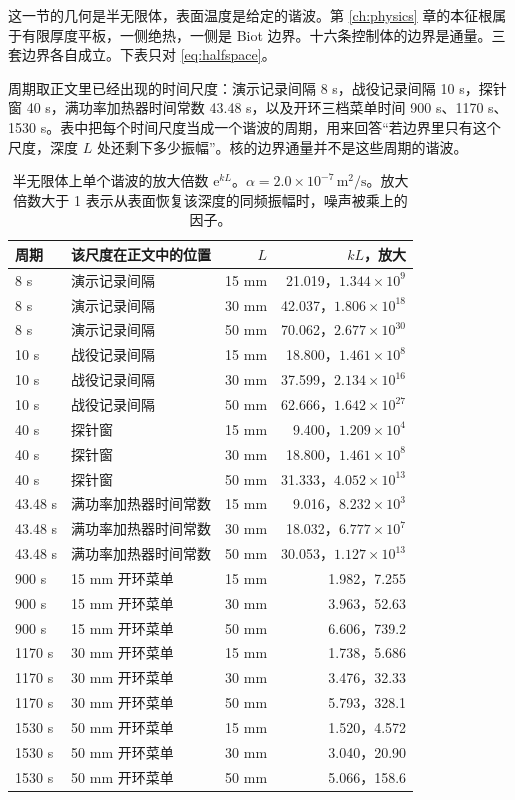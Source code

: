 这一节的几何是半无限体，表面温度是给定的谐波。第 \ref{ch:physics} 章的本征根属于有限厚度平板，一侧绝热，一侧是 Biot 边界。十六条控制体的边界是通量。三套边界各自成立。下表只对 \eqref{eq:halfspace}。

周期取正文里已经出现的时间尺度：演示记录间隔 8 s，战役记录间隔 10 s，探针窗 40 s，满功率加热器时间常数 43.48 s，以及开环三档菜单时间 900 s、1170 s、1530 s。表中把每个时间尺度当成一个谐波的周期，用来回答“若边界里只有这个尺度，深度 \(L\) 处还剩下多少振幅”。核的边界通量并不是这些周期的谐波。

\begin{table}[ht]
\centering
\caption{半无限体上单个谐波的放大倍数 \(\mathrm{e}^{kL}\)。\(\alpha=2.0\times 10^{-7}\,\mathrm{m}^2/\mathrm{s}\)。放大倍数大于 1 表示从表面恢复该深度的同频振幅时，噪声被乘上的因子。}
\small
\begin{tabular}{llrr}
\toprule
周期 & 该尺度在正文中的位置 & \(L\) & \(kL\)，放大 \\
\midrule
8 s & 演示记录间隔 & 15 mm & 21.019，\(1.344\times 10^{9}\) \\
8 s & 演示记录间隔 & 30 mm & 42.037，\(1.806\times 10^{18}\) \\
8 s & 演示记录间隔 & 50 mm & 70.062，\(2.677\times 10^{30}\) \\
10 s & 战役记录间隔 & 15 mm & 18.800，\(1.461\times 10^{8}\) \\
10 s & 战役记录间隔 & 30 mm & 37.599，\(2.134\times 10^{16}\) \\
10 s & 战役记录间隔 & 50 mm & 62.666，\(1.642\times 10^{27}\) \\
40 s & 探针窗 & 15 mm & 9.400，\(1.209\times 10^{4}\) \\
40 s & 探针窗 & 30 mm & 18.800，\(1.461\times 10^{8}\) \\
40 s & 探针窗 & 50 mm & 31.333，\(4.052\times 10^{13}\) \\
43.48 s & 满功率加热器时间常数 & 15 mm & 9.016，\(8.232\times 10^{3}\) \\
43.48 s & 满功率加热器时间常数 & 30 mm & 18.032，\(6.777\times 10^{7}\) \\
43.48 s & 满功率加热器时间常数 & 50 mm & 30.053，\(1.127\times 10^{13}\) \\
900 s & 15 mm 开环菜单 & 15 mm & 1.982，7.255 \\
900 s & 15 mm 开环菜单 & 30 mm & 3.963，52.63 \\
900 s & 15 mm 开环菜单 & 50 mm & 6.606，739.2 \\
1170 s & 30 mm 开环菜单 & 15 mm & 1.738，5.686 \\
1170 s & 30 mm 开环菜单 & 30 mm & 3.476，32.33 \\
1170 s & 30 mm 开环菜单 & 50 mm & 5.793，328.1 \\
1530 s & 50 mm 开环菜单 & 15 mm & 1.520，4.572 \\
1530 s & 50 mm 开环菜单 & 30 mm & 3.040，20.90 \\
1530 s & 50 mm 开环菜单 & 50 mm & 5.066，158.6 \\
\bottomrule
\end{tabular}
\end{table}

